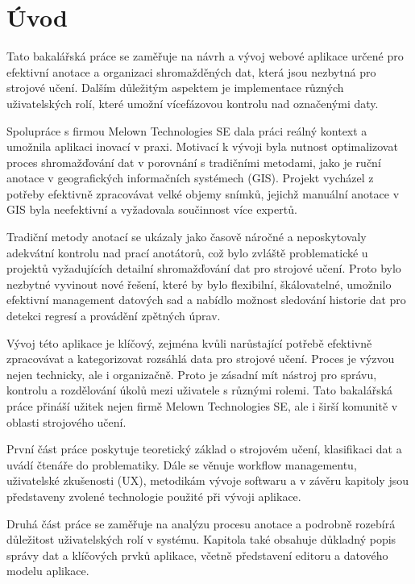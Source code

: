 \chapter{Úvod}

Tato bakalářská práce se zaměřuje na návrh a vývoj webové aplikace určené pro efektivní anotace a organizaci shromažděných dat, která jsou nezbytná pro strojové učení. Dalším důležitým aspektem je implementace různých uživatelských rolí, které umožní vícefázovou kontrolu nad označenými daty. 

Spolupráce s firmou Melown Technologies SE dala práci reálný kontext a umožnila aplikaci inovací v praxi. Motivací k vývoji byla nutnost optimalizovat proces shromažďování dat v porovnání s tradičními metodami, jako je ruční anotace v geografických informačních systémech (GIS). Projekt vycházel z potřeby efektivně zpracovávat velké objemy snímků, jejichž manuální anotace v GIS byla neefektivní a vyžadovala součinnost více expertů.

Tradiční metody anotací se ukázaly jako časově náročné a neposkytovaly adekvátní kontrolu nad prací anotátorů, což bylo zvláště problematické u projektů vyžadujících detailní shromažďování dat pro strojové učení. Proto bylo nezbytné vyvinout nové řešení, které by bylo flexibilní, škálovatelné, umožnilo efektivní management datových sad a nabídlo možnost sledování historie dat pro detekci regresí a provádění zpětných úprav.

Vývoj této aplikace je klíčový, zejména kvůli narůstající potřebě efektivně zpracovávat a kategorizovat rozsáhlá data pro strojové učení. Proces je výzvou nejen technicky, ale i organizačně. Proto je zásadní mít nástroj pro správu, kontrolu a rozdělování úkolů mezi uživatele s různými rolemi. Tato bakalářská práce přináší užitek nejen firmě Melown Technologies SE, ale i širší komunitě v oblasti strojového učení.

První část práce poskytuje teoretický základ o strojovém učení, klasifikaci dat a uvádí čtenáře do problematiky. Dále se věnuje workflow managementu, uživatelské zkušenosti (UX), metodikám vývoje softwaru a v závěru kapitoly jsou představeny zvolené technologie použité při vývoji aplikace.

Druhá část práce se zaměřuje na analýzu procesu anotace a podrobně rozebírá důležitost uživatelských rolí v systému. Kapitola také obsahuje důkladný popis správy dat a klíčových prvků aplikace, včetně představení editoru a datového modelu aplikace.

